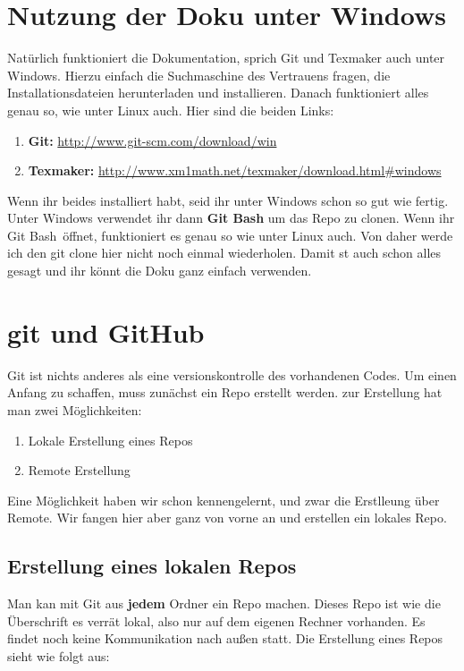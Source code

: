 \documentclass[a4paper,11pt]{scrartcl}	%
\begin{document}
\section{Nutzung der Doku unter Windows}

Natürlich funktioniert die Dokumentation, sprich Git und Texmaker auch unter Windows. Hierzu einfach die Suchmaschine des 
Vertrauens fragen, die Installationsdateien herunterladen und installieren. Danach funktioniert alles genau so, wie unter
Linux auch. Hier sind die beiden Links:

	\begin{enumerate} 
		\item \textbf{Git:} \url{http://www.git-scm.com/download/win}
		\item \textbf{Texmaker:} \url{http://www.xm1math.net/texmaker/download.html#windows}
	\end{enumerate}

Wenn ihr beides installiert habt, seid ihr unter Windows schon so gut wie fertig. Unter Windows verwendet ihr dann 
\textbf{Git Bash} um das Repo zu clonen. Wenn ihr \glqq Git Bash\grqq\ öffnet, funktioniert es genau so wie unter Linux auch.
Von daher werde ich den git clone hier nicht noch einmal wiederholen. Damit st auch schon alles gesagt und ihr könnt die Doku
ganz einfach verwenden.

\section{git und GitHub}

Git ist nichts anderes als eine versionskontrolle des vorhandenen Codes. Um einen Anfang zu schaffen, muss zunächst ein Repo
erstellt werden. zur Erstellung hat man zwei Möglichkeiten:
	
	\begin{enumerate}
		\item Lokale Erstellung eines Repos
		\item Remote Erstellung
	\end{enumerate}

Eine Möglichkeit haben wir schon kennengelernt, und zwar die Erstlleung über Remote. Wir fangen hier aber ganz von vorne an
und erstellen ein lokales Repo.

	\subsection{Erstellung eines lokalen Repos}
	Man kan mit Git aus \textbf{jedem} Ordner ein Repo machen. Dieses Repo ist wie die Überschrift es verrät lokal, also
	nur auf dem eigenen Rechner vorhanden. Es findet noch keine Kommunikation nach außen statt. Die Erstellung eines Repos
	sieht wie folgt aus:
\end{document}

